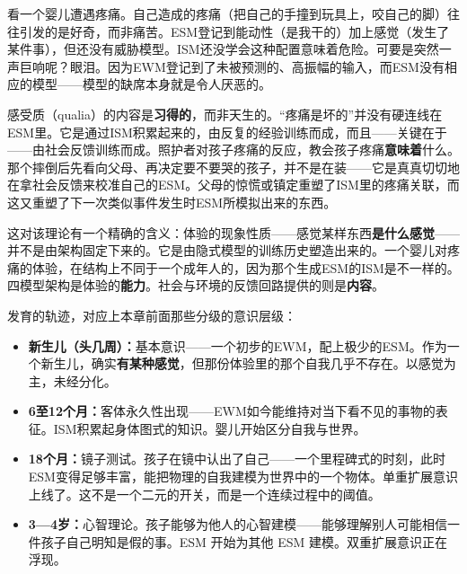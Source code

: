 \documentclass[11pt, twoside, openright]{book}
\begin{document}
看一个婴儿遭遇疼痛。自己造成的疼痛（把自己的手撞到玩具上，咬自己的脚）往往引发的是好奇，而非痛苦。ESM登记到能动性（是我干的）加上感觉（发生了某件事），但还没有威胁模型。ISM还没学会这种配置意味着危险。可要是突然一声巨响呢？眼泪。因为EWM登记到了未被预测的、高振幅的输入，而ESM没有相应的模型------模型的缺席本身就是令人厌恶的。

感受质（qualia）的内容是\textbf{习得的}，而非天生的。“疼痛是坏的”并没有硬连线在ESM里。它是通过ISM积累起来的，由反复的经验训练而成，而且------关键在于------由社会反馈训练而成。照护者对孩子疼痛的反应，教会孩子疼痛\textbf{意味着}什么。那个摔倒后先看向父母、再决定要不要哭的孩子，并不是在装------它是真真切切地在拿社会反馈来校准自己的ESM。父母的惊慌或镇定重塑了ISM里的疼痛关联，而这又重塑了下一次类似事件发生时ESM所模拟出来的东西。

这对该理论有一个精确的含义：体验的现象性质------感觉某样东西\textbf{是什么感觉}------并不是由架构固定下来的。它是由隐式模型的训练历史塑造出来的。一个婴儿对疼痛的体验，在结构上不同于一个成年人的，因为那个生成ESM的ISM是不一样的。四模型架构是体验的\textbf{能力}。社会与环境的反馈回路提供的则是\textbf{内容}。

发育的轨迹，对应上本章前面那些分级的意识层级：

\begin{itemize}
  \item \textbf{新生儿（头几周）：}基本意识------一个初步的EWM，配上极少的ESM。作为一个新生儿，确实\textbf{有某种感觉}，但那份体验里的那个自我几乎不存在。以感觉为主，未经分化。
\end{itemize}

\begin{itemize}
  \item \textbf{6至12个月：}客体永久性出现------EWM如今能维持对当下看不见的事物的表征。ISM积累起身体图式的知识。婴儿开始区分自我与世界。
\end{itemize}

\begin{itemize}
  \item \textbf{18个月：}镜子测试。孩子在镜中认出了自己------一个里程碑式的时刻，此时ESM变得足够丰富，能把物理的自我建模为世界中的一个物体。单重扩展意识上线了。这不是一个二元的开关，而是一个连续过程中的阈值。
\end{itemize}

\begin{itemize}
  \item \textbf{3---4岁：}心智理论。孩子能够为他人的心智建模------能够理解别人可能相信一件孩子自己明知是假的事。ESM 开始为其他 ESM 建模。双重扩展意识正在浮现。
\end{itemize}
\end{document}
